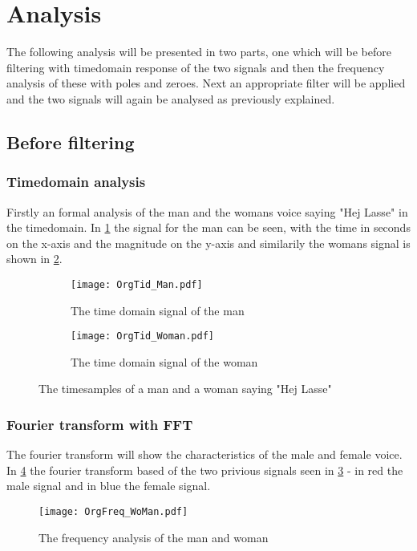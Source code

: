 
\section{Analysis}

The following analysis will be presented in two parts, one which will be before filtering with timedomain response of the two signals and then the frequency analysis of these with poles and zeroes. Next an appropriate filter will be applied and the two signals will again be analysed as previously explained.

\subsection{Before filtering}

\subsubsection{Timedomain analysis}

Firstly an formal analysis of the man and the womans voice saying "Hej Lasse" in the timedomain. In \cref{fig:time_man} the signal for the man can be seen, with the time in seconds on the x-axis and the magnitude on the y-axis and similarily the womans signal is shown in \cref{fig:time_woman}.

\begin{figure}
\centering
\begin{subfigure}{0.45\textwidth}
	\texttt{[image: OrgTid\_Man.pdf]}
	\caption{The time domain signal of the man}
	\label{fig:time_man}
\end{subfigure}
\quad
\begin{subfigure}{0.45\textwidth}
\texttt{[image: OrgTid\_Woman.pdf]}
\caption{The time domain signal of the woman}
\label{fig:time_woman}
\end{subfigure}
\caption{The timesamples of a man and a woman saying "Hej Lasse"}
\label{fig:time_WoMan}
\end{figure}

\subsubsection{Fourier transform with FFT}

The fourier transform will show the characteristics of the male and female voice. In \cref{fig:WoManFFT} the fourier transform based of the two privious signals seen in \cref{fig:time_WoMan} - in red the male signal and in blue the female signal.

\begin{figure}
\centering
\texttt{[image: OrgFreq\_WoMan.pdf]}
\caption{The frequency analysis of the man and woman}
\label{fig:WoManFFT}
\end{figure}

